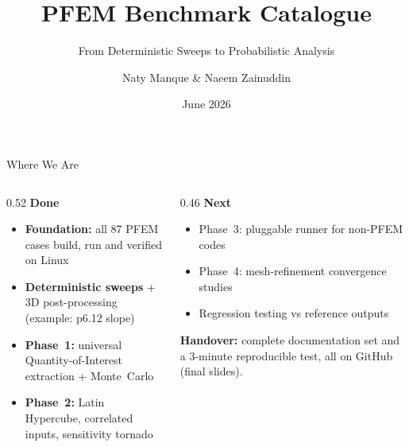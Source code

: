 \documentclass[aspectratio=169]{beamer}
\title{PFEM Benchmark Catalogue}
\subtitle{From Deterministic Sweeps to Probabilistic Analysis}
\author{Naty Manque \& Naeem Zainuddin}
\date{June 2026}
\begin{document}
\begin{frame}[plain]
    \titlepage
\end{frame}

\begin{frame}[shrink=15]{Where We Are}
    \begin{columns}[t]
        \begin{column}{0.52\textwidth}
            \textbf{Done}
            \begin{itemize}
                \setlength\itemsep{0.35em}
                \item[\textcolor{tugreen}{\ding{51}}] \textbf{Foundation:} all 87 PFEM cases build, run and verified on Linux
                \item[\textcolor{tugreen}{\ding{51}}] \textbf{Deterministic sweeps} + 3D post-processing \\(example: p6.12 slope)
                \item[\textcolor{tugreen}{\ding{51}}] \textbf{Phase~1:} universal Quantity-of-Interest extraction + Monte~Carlo
                \item[\textcolor{tugreen}{\ding{51}}] \textbf{Phase~2:} Latin Hypercube, correlated inputs, sensitivity tornado
            \end{itemize}
        \end{column}
        \begin{column}{0.46\textwidth}
            \textbf{Next}
            \begin{itemize}
                \setlength\itemsep{0.35em}
                \item Phase~3: pluggable runner for non-PFEM codes
                \item Phase~4: mesh-refinement convergence studies
                \item Regression testing vs reference outputs
            \end{itemize}
            \vspace{0.4cm}
            \textbf{Handover:} complete documentation set and a 3-minute reproducible test, all on GitHub (final slides).
        \end{column}
    \end{columns}
\end{frame}
\end{document}
